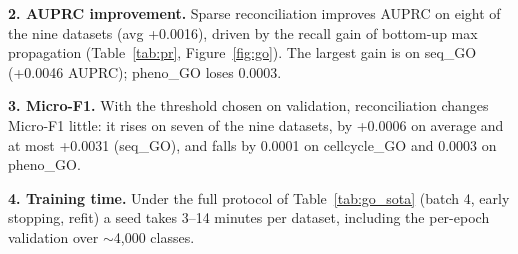 \documentclass[preprint,12pt]{elsarticle}
\begin{document}
\textbf{2. AUPRC improvement.} Sparse reconciliation improves AUPRC on
eight of the nine datasets (avg +0.0016), driven by the recall gain of
bottom-up max propagation (Table~\ref{tab:pr}, Figure~\ref{fig:go}).
The largest gain is on seq\_GO (+0.0046 AUPRC); pheno\_GO loses
0.0003.

\textbf{3. Micro-F1.} With the threshold chosen on validation,
reconciliation changes Micro-F1 little: it rises on seven of the nine
datasets, by +0.0006 on average and at most +0.0031 (seq\_GO), and
falls by 0.0001 on cellcycle\_GO and 0.0003 on pheno\_GO.

\textbf{4. Training time.} Under
the full protocol of Table~\ref{tab:go_sota} (batch 4, early stopping,
refit) a seed takes 3--14 minutes per dataset, including the
per-epoch validation over $\sim$4{,}000 classes.
\end{document}
